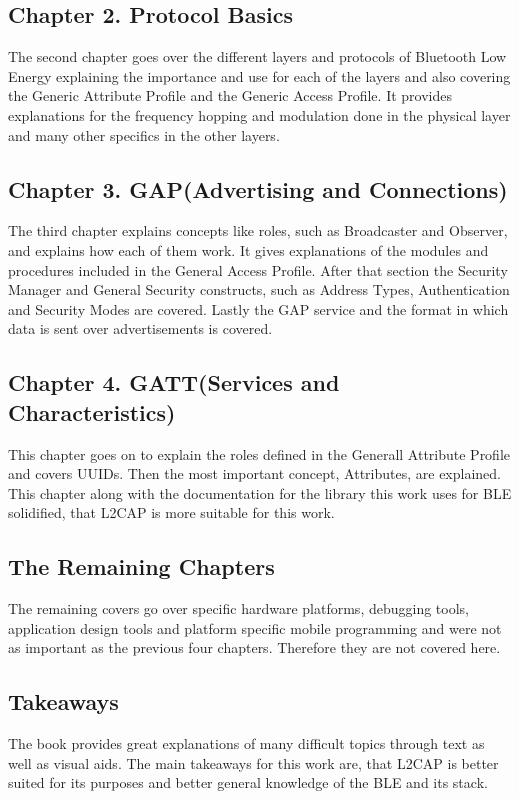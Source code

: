 \subsection{Chapter 2. Protocol Basics}
The second chapter goes over the different layers and protocols of Bluetooth Low Energy explaining the importance
and use for each of the layers and also covering the Generic Attribute Profile and the Generic Access Profile. It
provides explanations for the frequency hopping and modulation done in the physical layer and many other specifics
in the other layers.

\subsection{Chapter 3. GAP(Advertising and Connections)}
The third chapter explains concepts like roles, such as Broadcaster and Observer, and explains how each of them work.
It gives explanations of the modules and procedures included in the General Access Profile. After that section the Security
Manager and General Security constructs, such as Address Types, Authentication and Security Modes are covered. Lastly the GAP
service and the format in which data is sent over advertisements is covered.

\subsection{Chapter 4. GATT(Services and Characteristics)}
This chapter goes on to explain the roles defined in the Generall Attribute Profile and covers UUIDs.
Then the most important concept, Attributes, are explained. This chapter along with the documentation for the library this work uses for BLE solidified, that L2CAP is more suitable for this work. 

\subsection{The Remaining Chapters}
The remaining covers go over specific hardware platforms, debugging tools, application design tools and platform specific mobile
programming and were not as important as the previous four chapters. Therefore they are not covered here.

\subsection{Takeaways}
The book provides great explanations of many difficult topics through text as well as visual aids. The main takeaways for this work are, that L2CAP is better suited for its purposes and better general knowledge of the BLE and its stack.


\filbreak
